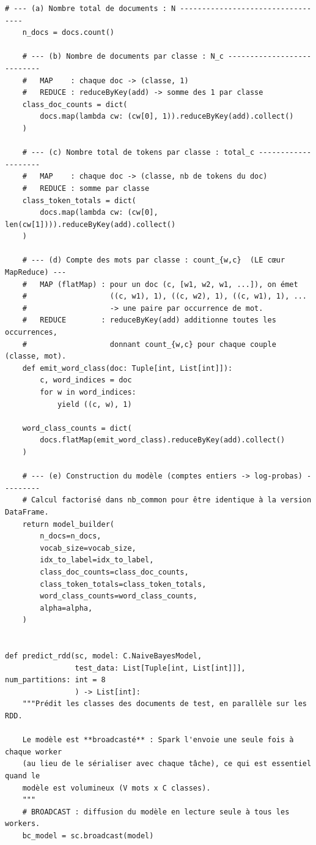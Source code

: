 \begin{lstlisting}[style=py]
    # --- (a) Nombre total de documents : N ----------------------------------
    n_docs = docs.count()

    # --- (b) Nombre de documents par classe : N_c ---------------------------
    #   MAP    : chaque doc -> (classe, 1)
    #   REDUCE : reduceByKey(add) -> somme des 1 par classe
    class_doc_counts = dict(
        docs.map(lambda cw: (cw[0], 1)).reduceByKey(add).collect()
    )

    # --- (c) Nombre total de tokens par classe : total_c --------------------
    #   MAP    : chaque doc -> (classe, nb de tokens du doc)
    #   REDUCE : somme par classe
    class_token_totals = dict(
        docs.map(lambda cw: (cw[0], len(cw[1]))).reduceByKey(add).collect()
    )

    # --- (d) Compte des mots par classe : count_{w,c}  (LE cœur MapReduce) ---
    #   MAP (flatMap) : pour un doc (c, [w1, w2, w1, ...]), on émet
    #                   ((c, w1), 1), ((c, w2), 1), ((c, w1), 1), ...
    #                   -> une paire par occurrence de mot.
    #   REDUCE        : reduceByKey(add) additionne toutes les occurrences,
    #                   donnant count_{w,c} pour chaque couple (classe, mot).
    def emit_word_class(doc: Tuple[int, List[int]]):
        c, word_indices = doc
        for w in word_indices:
            yield ((c, w), 1)

    word_class_counts = dict(
        docs.flatMap(emit_word_class).reduceByKey(add).collect()
    )

    # --- (e) Construction du modèle (comptes entiers -> log-probas) ---------
    # Calcul factorisé dans nb_common pour être identique à la version DataFrame.
    return model_builder(
        n_docs=n_docs,
        vocab_size=vocab_size,
        idx_to_label=idx_to_label,
        class_doc_counts=class_doc_counts,
        class_token_totals=class_token_totals,
        word_class_counts=word_class_counts,
        alpha=alpha,
    )


def predict_rdd(sc, model: C.NaiveBayesModel,
                test_data: List[Tuple[int, List[int]]], num_partitions: int = 8
                ) -> List[int]:
    """Prédit les classes des documents de test, en parallèle sur les RDD.

    Le modèle est **broadcasté** : Spark l'envoie une seule fois à chaque worker
    (au lieu de le sérialiser avec chaque tâche), ce qui est essentiel quand le
    modèle est volumineux (V mots x C classes).
    """
    # BROADCAST : diffusion du modèle en lecture seule à tous les workers.
    bc_model = sc.broadcast(model)


\end{lstlisting}
